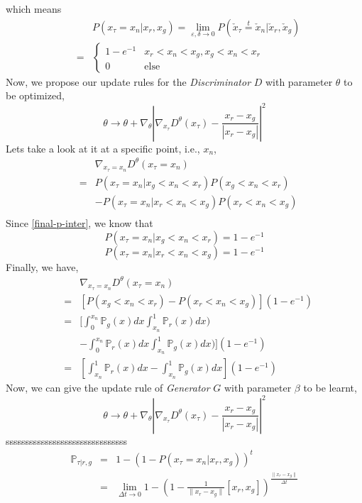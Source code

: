 \documentclass[letterpaper]{article} %
\begin{document}
which means
\begin{eqnarray}\label{final-p-inter}
    && P(x_\tau=x_n|x_r,x_g) = \lim_{\varepsilon,\delta\rightarrow0} P(\check{x}_\tau\overset{t}{=}\check{x}_n|\check{x}_r,\check{x}_g) \nonumber\\
    &=&
    \begin{cases}
        1 - e^{-1} &\mbox{$x_r<x_n<x_g,x_g<x_n<x_r$}\\
        0 &\mbox{else}
    \end{cases}
\end{eqnarray}
Now, we propose our update rules for the \textit{Discriminator} $D$ with parameter $\theta$ to be optimized,
\begin{equation}\label{g-loss}
  \theta \longrightarrow \theta + \nabla_{\theta} |\nabla_{x_{\tau}}D^{\theta}(x_{\tau})-\frac{x_{r}-x_{g}}{|x_{r}-x_{g}|}|^2
\end{equation}
Lets take a look at it at a specific point, i.e., $x_n$,
\begin{eqnarray}\label{p-epsilon-pr-pg-T}
    && \nabla_{x_{\tau}=x_n} D^{\theta}(x_{\tau}=x_n) \nonumber\\
    &=& P(x_\tau=x_n|x_g<x_n<x_r) P(x_g<x_n<x_r) \nonumber\\
    && - P(x_\tau=x_n|x_r<x_n<x_g) P(x_r<x_n<x_g) \nonumber\\
\end{eqnarray}
Since \eqref{final-p-inter}, we know that
\begin{equation}\label{p-inter-conditional-1}
  P(x_\tau=x_n|x_g<x_n<x_r)=1 - e^{-1}
\end{equation}
\begin{equation}\label{p-inter-conditional-2}
  P(x_\tau=x_n|x_r<x_n<x_g)=1 - e^{-1}
\end{equation}
Finally, we have,
\begin{eqnarray}\label{p-epsilon-pr-pg-T}
    && \nabla_{x_{\tau}=x_n} D^{\theta}(x_{\tau}=x_n) \nonumber\\
    &=& [P(x_g<x_n<x_r) - P(x_r<x_n<x_g)](1 - e^{-1}) \nonumber\\
    &=& [\int_{0}^{x_n}\mathbb{P}_g(x)dx \int_{x_n}^{1}\mathbb{P}_r(x)dx) \nonumber\\
    && - \int_{0}^{x_n}\mathbb{P}_r(x)dx \int_{x_n}^{1}\mathbb{P}_g(x)dx)](1 - e^{-1}) \nonumber\\
    &=& [\int_{x_n}^{1}\mathbb{P}_r(x)dx-\int_{x_n}^{1}\mathbb{P}_g(x)dx](1 - e^{-1})
\end{eqnarray}
Now, we can give the update rule of \textit{Generator} $G$ with parameter $\beta$ to be learnt,
\begin{equation}\label{g-loss}
  \theta \longrightarrow \theta + \nabla_{\theta} |\nabla_{x_{\tau}}D^{\theta}(x_{\tau})-\frac{x_{r}-x_{g}}{|x_{r}-x_{g}|}|^2
\end{equation}
sssssssssssssssssssssssssssssss
\begin{eqnarray}\label{p-epsilon-pr-pg-T}
  \nonumber \mathbb{P}_{\tau|r,g} &=& 1 - (1-P(x_\tau=x_n|x_r,x_g))^t \\
  &=& \lim_{\Delta t \rightarrow 0}1 - (1-\frac{1}{\|x_r-x_g\|} [x_r,x_g])^{\frac{\|x_r-x_g\|}{\Delta t}}
\end{eqnarray}
\end{document}
